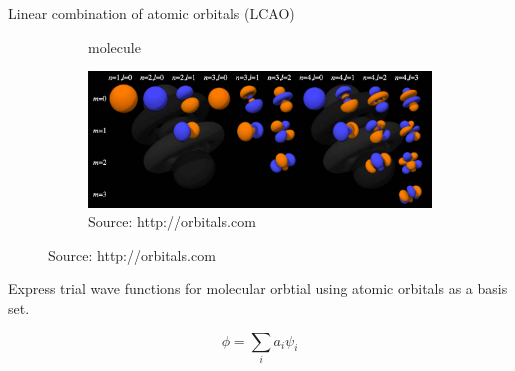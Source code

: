 \documentclass[aspectratio=169]{beamer}
\begin{document}
\begin{frame}{Linear combination of atomic orbitals (LCAO)}

\begin{figure}
\begin{subfigure}{0.45\textwidth}
\begin{modiagram}
\end{modiagram}
\caption{ molecule}
\end{subfigure}
\begin{subfigure}{0.45\textwidth}
    \includegraphics[width=\linewidth]{lectures/figures/2_atomic_orbitals.png}
    \caption{Source: http://orbitals.com}
    \end{subfigure}
\end{figure}
Express trial wave functions for molecular orbtial using atomic orbitals as a basis set.

\begin{equation*}
    \phi = \sum_i a_i \psi_i
\end{equation*}

\end{frame}
\end{document}

